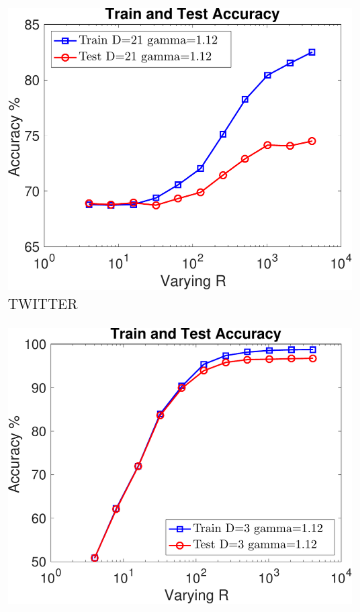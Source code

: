 \documentclass[11pt,a4paper]{article}
\newcommand{\1}{\boldsymbol{1}}
\begin{document}
\begin{figure}[ht]
\centering
		\begin{subfigure}[b]{0.23\textwidth}
      \includegraphics[width=\textwidth]{Graphs/wmdk_varyingR/twitter_random_VaryingR_allSplits_CV_R512-eps-converted-to.pdf}
      \caption{TWITTER}
      \label{fig:exptsA_varyingR_twitter}
      \end{subfigure}
      \begin{subfigure}[b]{0.23\textwidth}
      \includegraphics[width=\textwidth]{Graphs/wmdk_varyingR/classic_random_VaryingR_allSplits_CV_R512-eps-converted-to.pdf}

\end{subfigure}
\end{figure}
\end{document}
